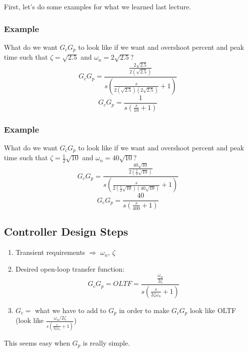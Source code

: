 \documentclass{book}
\newcommand{\exmp}{\subsubsection*{Example}}
\begin{document}
First, let's do some examples for what we learned last lecture.

\exmp
What do we want $ G_cG_p $ to look like if we want and overshoot percent and peak time such that $ \zeta = \sqrt{2.5} $ and $ \omega_n = 2\sqrt{2.5} $?
\[ G_cG_p = \frac{\frac{2\sqrt{2.5}}{2(\sqrt{2.5})}}{s\left(\frac{s}{2(\sqrt{2.5})(2\sqrt{2.5})}+1\right)} \]
\[ G_cG_p = \frac{1}{s\left(\frac{s}{10}+1\right)} \]

\exmp
What do we want $ G_cG_p $ to look like if we want and overshoot percent and peak time such that $ \zeta = \frac{1}{2}\sqrt{10} $ and $ \omega_n = 40\sqrt{10} $?
\[ G_cG_p = \frac{\frac{40\sqrt{10}}{2(\frac{1}{2}\sqrt{10})}}{s\left(\frac{s}{2(\frac{1}{2}\sqrt{10})(40\sqrt{10})}+1\right)} \]
\[ G_cG_p = \frac{40}{s\left(\frac{s}{400}+1\right)} \]

\subsection*{Controller Design Steps}
\begin{enumerate}
	\item Transient requirements $ \Longrightarrow $ $ \omega_n$, $\zeta $
	\item Desired open-loop transfer function:
	\[ G_cG_p = OLTF = \frac{\frac{\omega_n}{2\zeta}}{s\left(\frac{s}{2\zeta\omega_n}+1\right)} \]
	\item $ G_c =$ what we have to add to $ G_p $ in order to make $ G_cG_p $ look like OLTF (look like $ \frac{{\omega_n}/{2\zeta}}{s\left(\frac{s}{2\zeta\omega_n}+1\right)} $)
\end{enumerate}
This seems easy when $ G_p $ is really simple.
\end{document}
